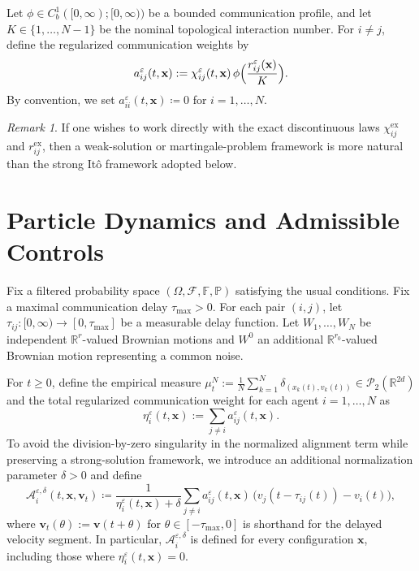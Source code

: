 \documentclass[pdflatex,sn-mathphys-num]{sn-jnl}%
\numberwithin{equation}{section}
\theoremstyle{thmstyleone}%
\theoremstyle{remark}
\newtheorem{remark}{Remark}
\theoremstyle{definition}
\newcommand{\R}{\mathbb{R}}
\newcommand{\Prob}{\mathbb{P}}
\newcommand{\calP}{\mathcal{P}}
\newcommand{\calF}{\mathcal{F}}
\begin{document}
Let $\phi\in C_b^1([0,\infty);[0,\infty))$ be a bounded communication
profile, and let $K\in\{1,\dots,N-1\}$ be the nominal topological interaction
number. For $i\neq j$, define the regularized communication weights by
\begin{equation}\label{eq:weight}
  a_{ij}^{\varepsilon}(t,\mathbf{x}) := \chi_{ij}^{\varepsilon}(t,\mathbf{x})\,
    \phi\Bigl(\frac{r_{ij}^{\varepsilon}(\mathbf{x})}{K}\Bigr).
\end{equation}
By convention, we set $a_{ii}^{\varepsilon}(t,\mathbf{x})\coloneqq 0$ for
$i=1,\dots,N$.
\begin{remark}\label{rem:weak-framework}
If one wishes to work directly with the exact discontinuous laws
$\chi_{ij}^{\mathrm{ex}}$ and $r_{ij}^{\mathrm{ex}}$, then a weak-solution or
martingale-problem framework is more natural than the strong It\^o
framework adopted below.
\end{remark}
\section{Particle Dynamics and Admissible Controls}
\label{sec:dynamics}

Fix a filtered probability space $(\Omega,\calF,\mathbb F,\Prob)$ satisfying
the usual conditions. Fix a maximal communication delay $\tau_{\max}>0$. For
each pair $(i,j)$, let $\tau_{ij}:[0,\infty)\to[0,\tau_{\max}]$ be a
measurable delay function. Let $W_1,\dots,W_N$ be independent $\R^{r}$-valued
Brownian motions and $W^0$ an additional $\R^{r_0}$-valued Brownian motion
representing a common noise.

For $t\ge 0$, define the empirical measure
$\mu_t^N := \frac{1}{N}\sum_{k=1}^N \delta_{(x_k(t),v_k(t))} \in \calP_2(\R^{2d})$
and the total regularized communication weight for each agent
$i=1,\dots,N$ as
\begin{equation}\label{eq:eta}
  \eta_i^\varepsilon(t,\mathbf{x}) := \sum_{j\neq i} a_{ij}^\varepsilon(t,\mathbf{x}).
\end{equation}
To avoid the division-by-zero singularity in the normalized alignment term
while preserving a strong-solution framework, we introduce an additional
normalization parameter $\delta>0$ and define
\begin{equation}\label{eq:alignop}
  \mathcal{A}_i^{\varepsilon,\delta}(t,\mathbf{x},\mathbf{v}_t)
  \coloneqq \frac{1}{\eta_i^\varepsilon(t,\mathbf{x})+\delta}
    \sum_{j\neq i} a_{ij}^\varepsilon(t,\mathbf{x})\,
    \bigl(v_j(t-\tau_{ij}(t))-v_i(t)\bigr),
\end{equation}
where $\mathbf{v}_t(\theta):=\mathbf{v}(t+\theta)$ for $\theta\in[-\tau_{\max},0]$ is
shorthand for the delayed velocity segment. In particular,
$\mathcal A_i^{\varepsilon,\delta}$ is defined for every configuration
$\mathbf{x}$, including those where $\eta_i^\varepsilon(t,\mathbf{x})=0$.
\end{document}
